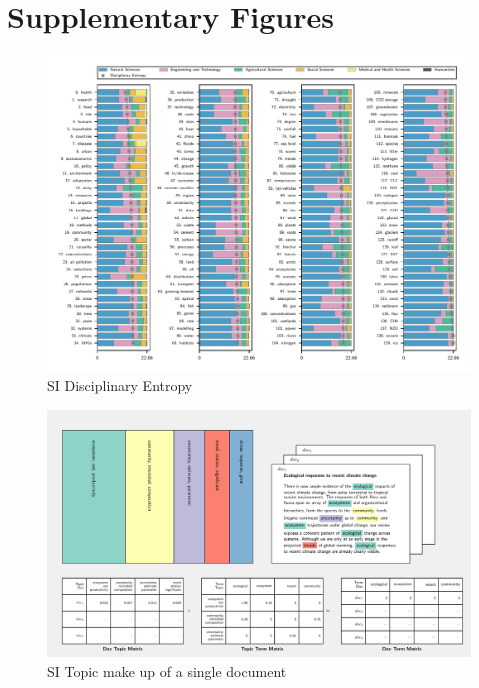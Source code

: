 \documentclass{article}
\begin{document}
	\section*{Supplementary Figures}
	
			\setcounter{figure}{0}
	\renewcommand\thefigure{SI.\arabic{figure}}  
	
	\begin{figure}
		\begin{center}
			\includegraphics[width=1\linewidth]{plots_pub/topic_oecd_entropy.pdf}
			\caption{SI Disciplinary Entropy}
			\label{dis-entropy}
		\end{center}
	\end{figure}	
	
	
	
	\begin{figure}
		\begin{center}
			\includegraphics[width=1\linewidth]{plots_pub/single_doc_3_536594_1861.pdf}
			\caption{SI Topic make up of a single document}
			\label{doc-topic}
		\end{center}
	\end{figure}
	
\end{document}
